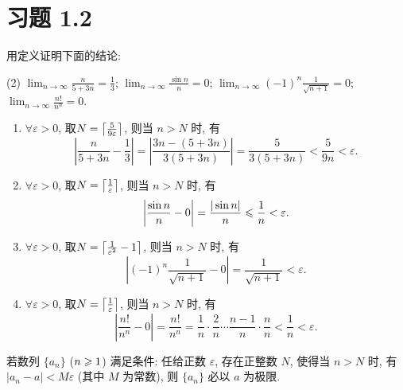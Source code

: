 \section*{习题 1.2}

\begin{exercise}[1.2.1]
    用定义证明下面的结论:
    \begin{tasks}[label=(\arabic*)](2)
        \task $\lim_{n\to\infty} \frac{n}{5+3n} = \frac{1}{3}$;
        \task $\lim_{n\to\infty} \frac{\sin n}{n} = 0$;
        \task $\lim_{n\to\infty} (-1)^n \frac{1}{\sqrt{n+1}} = 0$;
        \task $\lim_{n\to\infty} \frac{n!}{n^n} = 0$.
    \end{tasks}
\end{exercise}

\begin{solution}
    \begin{enumerate}[(1)]
        \item $\forall \varepsilon > 0$, 取$N = \llceil \frac{5}{9\varepsilon} \rrceil$, 则当 $n > N$ 时, 有
              $$
                  \left| \frac{n}{5 + 3n} - \frac{1}{3} \right| = \left| \frac{3n - (5 + 3n)}{3(5 + 3n)} \right| = \frac{5}{3(5 + 3n)} < \frac{5}{9n} < \varepsilon.
              $$
        \item $\forall \varepsilon > 0$, 取$N = \llceil \frac{1}{\varepsilon} \rrceil$, 则当 $n > N$ 时, 有
              $$
                  \left| \frac{\sin n}{n} - 0 \right| = \frac{|\sin n|}{n} \les \frac{1}{n} < \varepsilon.
              $$
        \item $\forall \varepsilon > 0$, 取$N = \llceil \frac{1}{\varepsilon^2} - 1 \rrceil$, 则当 $n > N$ 时, 有
              $$
                  \left| (-1)^n \frac{1}{\sqrt{n + 1}} - 0 \right| = \frac{1}{\sqrt{n + 1}} < \varepsilon.
              $$
        \item $\forall \varepsilon > 0$, 取$N = \llceil \frac{1}{\varepsilon} \rrceil$, 则当 $n > N$ 时, 有
              $$
                  \left| \frac{n!}{n^n} - 0 \right| = \frac{n!}{n^n} = \frac{1}{n} \cdot \frac{2}{n} \cdots \frac{n - 1}{n} \cdot \frac{n}{n} < \frac{1}{n} < \varepsilon.
              $$
    \end{enumerate}
\end{solution}

\begin{exercise}[1.2.2]
    若数列 $\{a_n\}$ ($n \ges 1$) 满足条件: 任给正数 $\varepsilon$, 存在正整数 $N$, 使得当 $n > N$ 时, 有 $|a_n - a| < M\varepsilon$ (其中 $M$ 为常数), 则 $\{a_n\}$ 必以 $a$ 为极限.
\end{exercise}

